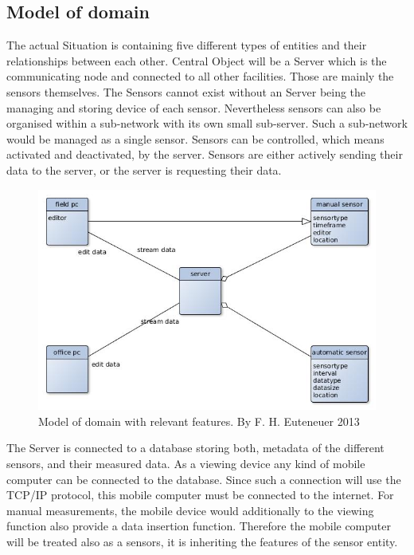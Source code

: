 \subsection{Model of domain}
The actual Situation is containing five different types of entities and their relationships between each other. Central Object will be a Server which is the communicating node and connected to all other facilities. Those are mainly the sensors themselves. The Sensors cannot exist without an Server being the managing and storing device of each sensor. Nevertheless sensors can also be organised within a sub-network with its own small sub-server. Such a sub-network would be managed as a single sensor. Sensors can be controlled, which means activated and deactivated, by the server. Sensors are either actively sending their data to the server, or the server is requesting their data.

\begin{figure}[H]
	\centering
 	 \includegraphics[scale=0.6]{graphics/model_of_issue.jpg} 
	\caption{Model of domain with relevant features. By F. H. Euteneuer 2013}
	 \label{fig:model_domain}
\end{figure}

The Server is connected to a database storing both, metadata of the different sensors, and their measured data. As a viewing device any kind of mobile computer can be connected to the database. Since such a connection will use the TCP/IP protocol, this mobile computer must be connected to the internet. For manual measurements, the mobile device would additionally to the viewing function also provide a data insertion function. Therefore the mobile computer will be treated also as a sensors, it is inheriting the features of the sensor entity.

